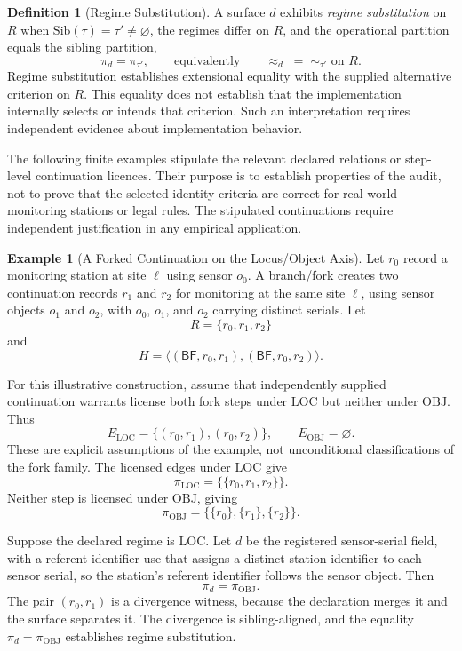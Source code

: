 \documentclass[11pt]{article}
\theoremstyle{plain}
\theoremstyle{definition}
\newtheorem{definition}[theorem]{Definition}
\newtheorem{example}[theorem]{Example}
\theoremstyle{remark}
\newcommand{\BF}{\ensuremath{\mathsf{BF}}}
\newcommand{\LOC}{\ensuremath{\mathrm{LOC}}}
\newcommand{\OBJ}{\ensuremath{\mathrm{OBJ}}}
\newcommand{\Sib}{\ensuremath{\mathrm{Sib}}}
\newcommand{\Ker}{\ensuremath{\mathrel{\approx_{d}}}}
\begin{document}
\begin{definition}[Regime Substitution]
  \label{oi.def.regime-substitution}
  A surface \(d\) exhibits \emph{regime substitution} on \(R\)
  when \(\Sib(\tau)=\tau'\neq\varnothing\),
  the regimes differ on \(R\),
  and the operational partition equals the sibling partition,
  \[
    \pi_d
    =
    \pi_{\tau'},
    \qquad\text{equivalently}\qquad
    \Ker\;=\;\sim_{\tau'}
    \text{ on }R.
  \]
  Regime substitution establishes extensional equality
  with the supplied alternative criterion on \(R\).
  This equality does not establish that the
  implementation internally selects or intends that criterion.
  Such an interpretation requires
  independent evidence about implementation behavior.
\end{definition}

The following finite examples stipulate the relevant
declared relations or step-level continuation licences.
Their purpose is to establish properties of the audit,
not to prove that the selected identity criteria are
correct for real-world monitoring stations or legal rules.
The stipulated continuations require independent
justification in any empirical application.

\begin{example}[A Forked Continuation on the Locus/Object Axis]
  \label{oi.ex.loc-obj-fork}
  Let \(r_0\) record a monitoring station at site \(\ell\) using sensor \(o_0\).
  A branch/fork creates two continuation records \(r_1\) and \(r_2\)
  for monitoring at the same site \(\ell\),
  using sensor objects \(o_1\) and \(o_2\), with \(o_0\), \(o_1\), and \(o_2\) carrying distinct serials.
  Let
  \[
    R=\{r_0,r_1,r_2\}
  \]
  and
  \[
    H
    =
    \bigl\langle
    (\BF{},r_0,r_1),
    (\BF{},r_0,r_2)
    \bigr\rangle.
  \]

  For this illustrative construction, assume that
  independently supplied continuation warrants license
  both fork steps under \LOC{} but neither under \OBJ{}.
  Thus
  \[
    E_{\LOC}
    =
    \{(r_0,r_1),(r_0,r_2)\},
    \qquad
    E_{\OBJ}=\varnothing.
  \]
  These are explicit assumptions of the example,
  not unconditional classifications of the fork family.
  The licensed edges under \LOC{} give
  \[
    \pi_{\LOC}
    =
    \bigl\{\{r_0,r_1,r_2\}\bigr\}.
  \]
  Neither step is licensed under \OBJ{},
  giving
  \[
    \pi_{\OBJ}
    =
    \bigl\{\{r_0\},\{r_1\},\{r_2\}\bigr\}.
  \]

  Suppose the declared regime is \LOC{}.
  Let \(d\) be the registered sensor-serial field,
  with a referent-identifier use that assigns
  a distinct station identifier to each sensor serial,
  so the station's referent identifier follows the sensor object.
  Then
  \[
    \pi_d=\pi_{\OBJ}.
  \]
  The pair \((r_0,r_1)\) is a divergence witness,
  because the declaration merges it
  and the surface separates it.
  The divergence is sibling-aligned,
  and the equality \(\pi_d=\pi_{\OBJ}\)
  establishes regime substitution.
\end{example}
\end{document}
